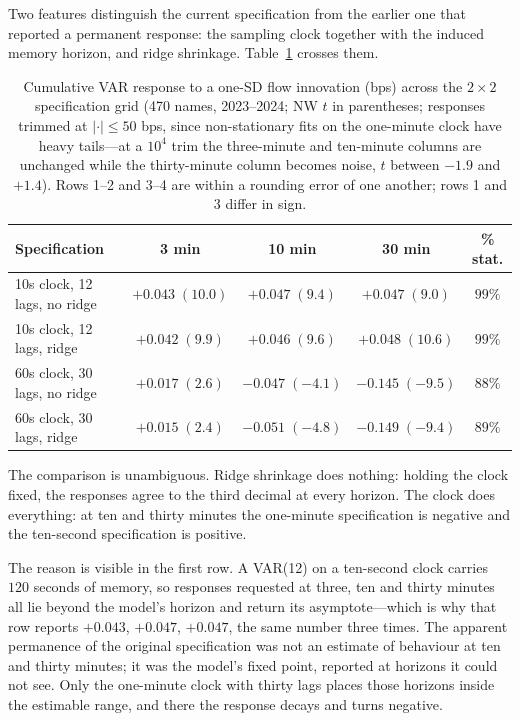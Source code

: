 \documentclass[11pt]{article}
\begin{document}
Two features distinguish the current specification from the earlier one that reported a
permanent response: the sampling clock together with the induced memory horizon, and ridge
shrinkage. Table~\ref{tab:vargrid} crosses them.

\begin{table}[htbp]
\centering
\begin{tabular}{lcccc}
\toprule
\textbf{Specification} & \textbf{3 min} & \textbf{10 min} & \textbf{30 min} & \textbf{\% stat.} \\
\midrule
10s clock, 12 lags, no ridge & $+0.043\;(10.0)$ & $+0.047\;(9.4)$ & $+0.047\;(9.0)$ & $99\%$ \\
10s clock, 12 lags, ridge & $+0.042\;(9.9)$ & $+0.046\;(9.6)$ & $+0.048\;(10.6)$ & $99\%$ \\
60s clock, 30 lags, no ridge & $+0.017\;(2.6)$ & $-0.047\;(-4.1)$ & $-0.145\;(-9.5)$ & $88\%$ \\
60s clock, 30 lags, ridge & $+0.015\;(2.4)$ & $-0.051\;(-4.8)$ & $-0.149\;(-9.4)$ & $89\%$ \\
\bottomrule
\end{tabular}
\caption{Cumulative VAR response to a one-SD flow innovation (bps) across the $2\times2$
specification grid (470 names, 2023--2024; NW $t$ in parentheses; responses trimmed at
$|\cdot|\le50$ bps, since non-stationary fits on the one-minute clock have heavy tails---at a
$10^4$ trim the three-minute and ten-minute columns are unchanged while the thirty-minute
column becomes noise, $t$ between $-1.9$ and $+1.4$). Rows 1--2 and 3--4 are within a
rounding error of one another; rows 1 and 3 differ in sign.}
\label{tab:vargrid}
\end{table}

The comparison is unambiguous. Ridge shrinkage does nothing: holding the clock fixed, the
responses agree to the third decimal at every horizon. The clock does everything: at ten and
thirty minutes the one-minute specification is negative and the ten-second specification is
positive.

The reason is visible in the first row. A VAR(12) on a ten-second clock carries $120$ seconds
of memory, so responses requested at three, ten and thirty minutes all lie beyond the model's
horizon and return its asymptote---which is why that row reports $+0.043$, $+0.047$, $+0.047$,
the same number three times. The apparent permanence of the original specification was not an
estimate of behaviour at ten and thirty minutes; it was the model's fixed point, reported at
horizons it could not see. Only the one-minute clock with thirty lags places those horizons
inside the estimable range, and there the response decays and turns negative.
\end{document}
